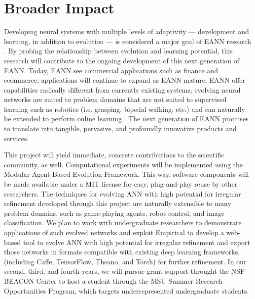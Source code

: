 \section{Broader Impact}

Developing neural systems with multiple levels of adaptivity --- development and learning, in addition to evolution --- is considered a major goal of EANN research \autocite{Downing2015IntelligenceSystems}.
By probing the relationship between evolution and learning potential, this research will contribute to the ongoing development of this next generation of EANN.
Today, EANN see commercial applications such as finance and ecommerce; applications will continue to expand as EANN mature.
EANN offer capabilities radically different from currently existing systems; evolving neural networks are suited to problem domains that are not suited to supervised learning such as robotics (i.e. grasping, bipedal walking, etc.) \autocite{Downing2015IntelligenceSystems} and can naturally be extended to perform online learning \autocite{Tonelli2013OnNetworks}.
The next generation of EANN promises to translate into tangible, pervasive, and profoundly innovative products and services.

This project will yield immediate, concrete contributions to the scientific community, as well.
Computational experiments will be implemented using the Modular Agent Based Evolution Framework.\autocite{Hintze2017Mabe}
This way, software components will be made available under a MIT license for easy, plug-and-play reuse by other researchers.
The techniques for evolving ANN with high potential for irregular refinement developed through this project are naturally extensible to many problem domains, such as game-playing agents, robot control, and image classification.
We plan to work with undergraduate researchers to demonstrate applications of such evolved networks and exploit Empirical to develop a web-based tool to evolve ANN with high potential for irregular refinement and export those networks in formats compatible with existing deep learning frameworks, (including Caffe, TensorFlow, Theano, and Torch) for further refinement.
In our second, third, and fourth years, we will pursue grant support throught the NSF BEACON Center to host a student through the MSU Summer Research Opportunities Program, which targets underrepresented undergraduate students.

